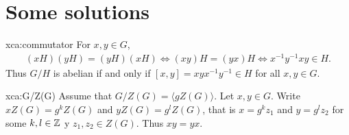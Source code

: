 \chapter*{Some solutions}

\pagestyle{plain}
\fancyhf{}
\fancyfoot[CE,CO]{\leftmark}
\fancyfoot[LE,RO]{\thepage}


\begin{sol}{xca:commutator}
For $x,y\in G$,
\begin{align*}
    (xH)(yH)=(yH)(xH) \Longleftrightarrow (xy)H=(yx)H \Longleftrightarrow x^{-1}y^{-1}xy\in H.
\end{align*}
Thus $G/H$ is abelian if and only if  $[x,y]=xyx^{-1}y^{-1}\in H$ for all $x,y\in G$.
\end{sol}


\begin{sol}{xca:G/Z(G)}
Assume that $G/Z(G)=\langle gZ(G)\rangle$. Let $x,y\in G$. 
Write $xZ(G)=g^kZ(G)$ and $yZ(G)=g^lZ(G)$, 
that is 
$x=g^kz_1$ and $y=g^lz_2$ for some $k,l\in\mathbb{Z}$ y $z_1,z_2\in Z(G)$. Thus $xy=yx$.
\end{sol}
